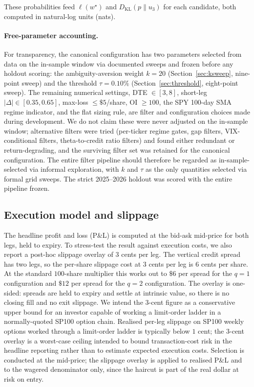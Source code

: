 \documentclass[11pt]{article}
\theoremstyle{definition}
\theoremstyle{remark}
\newcommand{\KL}{D_{\mathrm{KL}}}
\begin{document}
These probabilities feed $\ell(w^\star)$ and $\KL(p \| u_3)$ for
each candidate, both computed in natural-log units (nats).

\paragraph{Free-parameter accounting.}
For transparency, the canonical configuration has two parameters
selected from data on the in-sample window via documented sweeps
and frozen before any holdout scoring: the ambiguity-aversion
weight $k = 20$ (Section~\ref{sec:ksweep}, nine-point sweep) and
the threshold $\tau = 0.10\%$ (Section~\ref{sec:threshold},
eight-point sweep). The remaining numerical settings,
DTE $\in [3, 8]$, short-leg $|\Delta| \in [0.35, 0.65]$, max-loss
$\le \$5$/share, OI $\ge 100$, the SPY 100-day SMA regime indicator,
and the flat sizing rule, are filter and
configuration choices made during development. We do not claim these were never adjusted on the
in-sample window; alternative filters were tried (per-ticker
regime gates, gap filters, VIX-conditional filters,
theta-to-credit ratio filters) and found either redundant or
return-degrading, and the surviving filter set was retained for
the canonical configuration. The entire filter pipeline should
therefore be regarded as in-sample-selected via informal
exploration, with $k$ and $\tau$ as the only quantities selected
via formal grid sweeps. The strict 2025--2026 holdout was
scored with the entire pipeline frozen.

\subsection{Execution model and slippage}\label{sec:slippage}

The headline profit and loss (P\&L) is computed at the bid-ask
mid-price for both legs, held to expiry. To stress-test the
result against execution costs, we also report a post-hoc
slippage overlay of $3$ cents per leg. The vertical credit spread
has two legs, so the per-share slippage cost at $3$ cents per leg
is $6$ cents per share. At the standard $100$-share multiplier
this works out to $\$6$ per spread for the $q = 1$ configuration
and $\$12$ per spread for the $q = 2$ configuration. The overlay
is one-sided: spreads are held to expiry and settle at intrinsic
value, so there is no closing fill and no exit slippage. We
intend the $3$-cent figure as a conservative upper bound for an
investor capable of working a limit-order ladder in a
normally-quoted SP100 option chain. Realised per-leg slippage on
SP100 weekly options worked through a limit-order ladder is
typically below $1$ cent; the $3$-cent overlay is a worst-case
ceiling intended to bound transaction-cost risk in the headline
reporting rather than to estimate expected execution costs.
Selection is conducted at the mid-price; the slippage overlay is
applied to realised P\&L and to the wagered denominator only,
since the haircut is part of the real dollar at risk on entry.
\end{document}
